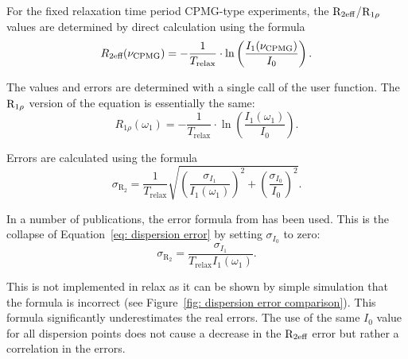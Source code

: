 For the fixed relaxation time period CPMG-type experiments, the $\mathrm{R}_{2\textrm{eff}}$/$\mathrm{R}_{1\rho}$ values are determined by direct calculation using the formula
\begin{equation}
    R_{2\textrm{eff}}(\nu_\textrm{CPMG}) = - \frac{1}{T_\textrm{relax}} \cdot \ln \left( \frac{I_1(\nu_\textrm{CPMG})}{I_0} \right) .
\end{equation}

The values and errors are determined with a single call of the  user function.  The $\mathrm{R}_{1\rho}$ version of the equation is essentially the same:
\begin{equation}
    R_{1\rho}(\omega_1) = - \frac{1}{T_\textrm{relax}} \cdot \ln \left( \frac{I_1(\omega_1)}{I_0} \right) .
\end{equation}

Errors are calculated using the formula
\begin{equation} \label{eq: dispersion error}
    \sigma_{\textrm{R}_2} = \frac{1}{T_\textrm{relax}} \sqrt{ \left( \frac{\sigma_{I_1}}{I_1(\omega_1)} \right)^2  +  \left( \frac{\sigma_{I_0}}{I_0} \right)^2 } .
\end{equation}

In a number of publications, the error formula from \citet{IshimaTorchia05} has been used.  This is the collapse of Equation~\ref{eq: dispersion error} by setting $\sigma_{I_0}$ to zero:
\begin{equation} \label{eq: IT05 dispersion error}
    \sigma_{\textrm{R}_2} = \frac{\sigma_{I_1}}{T_\textrm{relax} I_1(\omega_1)} .
\end{equation}

This is not implemented in relax as it can be shown by simple simulation that the formula is incorrect (see Figure~\ref{fig: dispersion error comparison}).  This formula significantly underestimates the real errors.  The use of the same $I_0$ value for all dispersion points does not cause a decrease in the $\mathrm{R}_{2\textrm{eff}}$ error but rather a correlation in the errors.


